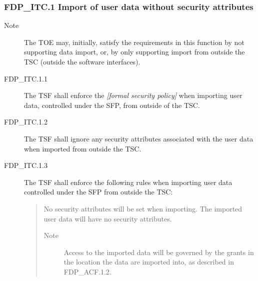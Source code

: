 \documentclass[10pt,a4paper,english]{article}
\begin{document}

\hypertarget{fdp-itc-1-import-of-user-data-without-security-attributes}{}
\subsubsection*{FDP{\_}ITC.1 Import of user data without security attributes}
\begin{description}
\item[Note]

The TOE may, initially, satisfy the requirements in this
function by not supporting data import, or, by only
supporting import from outside the TSC (outside the
software interfaces).

\item[FDP{\_}ITC.1.1]

The TSF shall enforce the \emph{{[}formal security policy]} when importing user 
data, controlled under the SFP, from outside of the TSC.

\item[FDP{\_}ITC.1.2]

The TSF shall ignore any security attributes associated with the user data 
when imported from outside the TSC.

\item[FDP{\_}ITC.1.3]

The TSF shall enforce the following rules when importing user data 
controlled under the SFP from outside the TSC:
\begin{quote}

No security attributes will be set when importing. The imported
user data will have no security attributes.
\begin{description}
\item[Note]

Access to the imported data will be governed by the grants in
the location the data are imported into, as described in
FDP{\_}ACF.1.2.

\end{description}
\end{quote}

\end{description}
\end{document}
